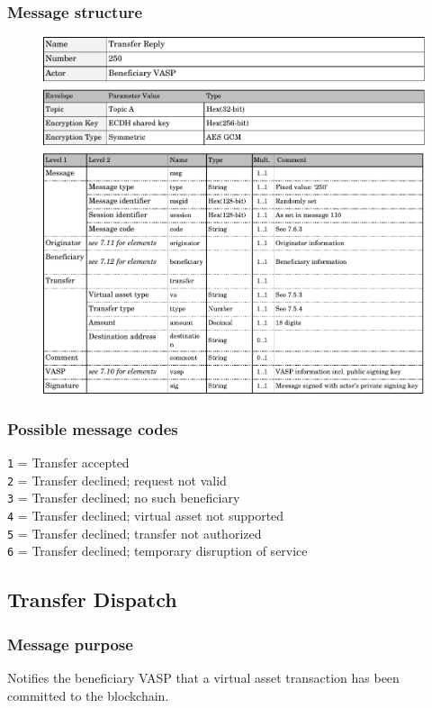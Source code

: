\documentclass{article}
\begin{document}
\subsubsection{Message structure}
\vspace{-1em}
\begin{figure}[h]
    \centering
    \includegraphics[width=\textwidth]{g23.pdf}
\end{figure}
\subsubsection{Possible message codes}
\verb+1+ = Transfer accepted\\
\verb+2+ = Transfer declined; request not valid\\
\verb+3+ = Transfer declined; no such beneficiary\\
\verb+4+ = Transfer declined; virtual asset not supported\\
\verb+5+ = Transfer declined; transfer not authorized\\
\verb+6+ = Transfer declined; temporary disruption of service\\
\newpage


\subsection{Transfer Dispatch}
\subsubsection{Message purpose}
Notifies the beneficiary VASP that a virtual asset transaction has been committed to the blockchain.
\end{document}
